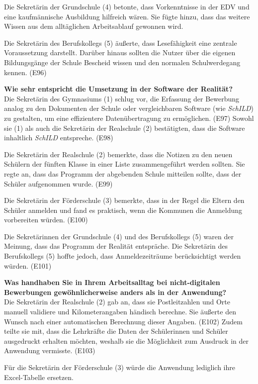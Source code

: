 Die Sekretärin der Grundschule (4) betonte, dass Vorkenntnisse in der EDV und eine kaufmännische Ausbildung hilfreich wären. Sie fügte hinzu, dass das weitere Wissen aus dem alltäglichen Arbeitsablauf gewonnen wird.

Die Sekretärin des Berufskollegs (5) äußerte, dass Lesefähigkeit eine zentrale Voraussetzung darstellt. Darüber hinaus sollten die Nutzer über die eigenen Bildungsgänge der Schule Bescheid wissen und den normalen Schulwerdegang kennen. (E96)

\textbf{Wie sehr entspricht die Umsetzung in der Software der Realität?}\\
Die Sekretärin des Gymnasiums (1) schlug vor, die Erfassung der Bewerbung analog zu den Dokumenten der Schule oder vergleichbaren Software (wie \textit{SchILD}) zu gestalten, um eine effizientere Datenübertragung zu ermöglichen. (E97) Sowohl sie (1) als auch die Sekretärin der Realschule (2) bestätigten, dass die Software inhaltlich \textit{SchILD} entspreche. (E98)

Die Sekretärin der Realschule (2) bemerkte, dass die Notizen zu den neuen Schülern der fünften Klasse in einer Liste zusammengeführt werden sollten. Sie regte an, dass das Programm der abgebenden Schule mitteilen sollte, dass der Schüler aufgenommen wurde. (E99)

Die Sekretärin der Förderschule (3) bemerkte, dass in der Regel die Eltern den Schüler anmelden und fand es praktisch, wenn die Kommunen die Anmeldung vorbereiten würden. (E100)

Die Sekretärinnen der Grundschule (4) und des Berufskollegs (5) waren der Meinung, dass das Programm der Realität entspräche. Die Sekretärin des Berufskollegs (5) hoffte jedoch, dass Anmeldezeiträume berücksichtigt werden würden. (E101)

\textbf{Was handhaben Sie in Ihrem Arbeitsalltag bei nicht-digitalen Bewerbungen gewöhnlicherweise anders als in der Anwendung?}\\
Die Sekretärin der Realschule (2) gab an, dass sie Postleitzahlen und Orte manuell validiere und Kilometerangaben händisch berechne. Sie äußerte den Wunsch nach einer automatischen Berechnung dieser Angaben. (E102) Zudem teilte sie mit, dass die Lehrkräfte die Daten der Schülerinnen und Schüler ausgedruckt erhalten möchten, weshalb sie die Möglichkeit zum Ausdruck in der Anwendung vermisste. (E103)

Für die Sekretärin der Förderschule (3) würde die Anwendung lediglich ihre Excel-Tabelle ersetzen.

